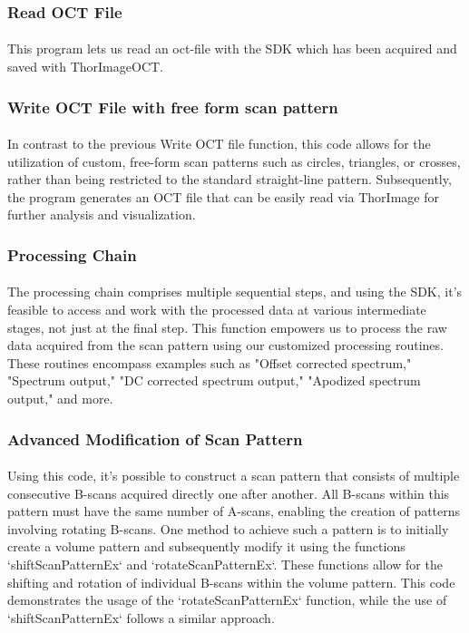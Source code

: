 \subsubsection{Read OCT File}
\paragraph{}
This program lets us read an oct-file with the SDK which has been acquired and saved with ThorImageOCT.

\subsubsection{Write OCT File with free form scan pattern}
\paragraph{}
In contrast to the previous Write OCT file function, this code allows for the utilization of custom, free-form scan patterns such as circles, triangles, or crosses, rather than being restricted to the standard straight-line pattern. Subsequently, the program generates an OCT file that can be easily read via ThorImage for further analysis and visualization.

\newpage
\subsubsection{Processing Chain}
\paragraph{}
The processing chain comprises multiple sequential steps, and using the SDK, it's feasible to access and work with the processed data at various intermediate stages, not just at the final step. This function empowers us to process the raw data acquired from the scan pattern using our customized processing routines. These routines encompass examples such as "Offset corrected spectrum," "Spectrum output," "DC corrected spectrum output," "Apodized spectrum output," and more.

\subsubsection{Advanced Modification of Scan Pattern}
\paragraph{}
Using this code, it's possible to construct a scan pattern that consists of multiple consecutive B-scans acquired directly one after another. All B-scans within this pattern must have the same number of A-scans, enabling the creation of patterns involving rotating B-scans. One method to achieve such a pattern is to initially create a volume pattern and subsequently modify it using the functions `shiftScanPatternEx` and `rotateScanPatternEx`. These functions allow for the shifting and rotation of individual B-scans within the volume pattern. This code demonstrates the usage of the `rotateScanPatternEx` function, while the use of `shiftScanPatternEx` follows a similar approach.

